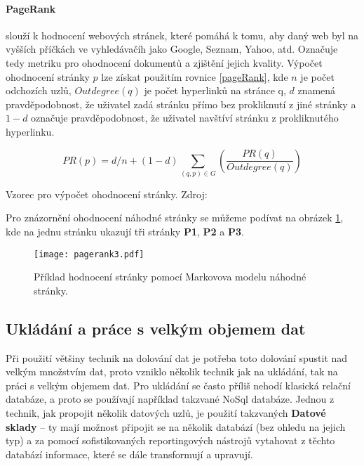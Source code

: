 \paragraph{PageRank} slouží k hodnocení webových stránek, které pomáhá k tomu, aby daný web byl na vyšších příčkách ve vyhledávačíh jako Google, Seznam, Yahoo, atd. Označuje tedy metriku pro ohodnocení dokumentů a zjištění jejich kvality. Výpočet ohodnocení stránky \(p\) lze získat použitím rovnice \ref{pageRank}, kde \(n\) je počet odchozích uzlů, \(Outdegree(q)\) je počet hyperlinků na stránce q, \(d\) znamená pravděpodobnost, že uživatel zadá stránku přímo bez prokliknutí z jiné stránky a \(1 - d\) označuje pravděpodobnost, že uživatel navštíví stránku z prokliknutého hyperlinku. \cite{minigbook}
\begin{equationcap}
\begin{equation} \label{pageRank}
PR(p) = d/n + (1-d) \sum_{(q,p) \in G}(\frac{PR(q)}{Outdegree(q)})
\end{equation}
\caption[Vzorec pro výpočet ohodnocení stránky]{Vzorec pro výpočet ohodnocení stránky. Zdroj: \cite{data-mining-principles}}
\end{equationcap}

\par Pro znázornění ohodnocení náhodné stránky se můžeme podívat na obrázek \ref{pageRankFig}, kde na jednu stránku ukazují tři stránky \textbf{P1}, \textbf{P2} a \textbf{P3}.
\begin{figure}[htp]
\centering
\texttt{[image: pagerank3.pdf]}
\caption{Příklad hodnocení stránky pomocí Markovova modelu náhodné stránky.}
\label{pageRankFig}
\end{figure}

\subsection{Ukládání a práce s velkým objemem dat}
\par Při použití většiny technik na dolování dat je potřeba toto dolování spustit nad velkým množstvím dat, proto vzniklo několik technik jak na ukládání, tak na práci s velkým objemem dat. Pro ukládání se často příliš nehodí klasická relační databáze, a proto se používají například takzvané NoSql databáze. Jednou z technik, jak propojit několik datových uzlů, je použití takzvaných \textbf{Datové sklady} -- ty mají možnost připojit se na několik databází (bez ohledu na jejich typ) a za pomocí sofistikovaných reportingových nástrojů vytahovat z těchto databází informace, které se dále transformují a upravují.

